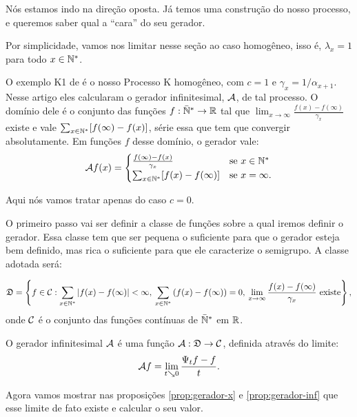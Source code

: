 Nós estamos indo na direção oposta. Já temos uma construção do nosso
processo, e queremos saber qual a ``cara'' do seu gerador.

Por simplicidade, vamos nos limitar nesse seção ao caso homogêneo,
isso é, $\lambda_x = 1$ para todo $x \in {\mathbb{N^*}}$.

O exemplo K1 de \cite{kendall:56} é o nosso Processo K homogêneo, com
$c = 1$ e $\gamma_x = 1/\alpha_{x+1}$. Nesse artigo eles calcularam o
gerador infinitesimal, ${\mathcal{A}}$, de tal processo. O domínio dele é o
conjunto das funções $f: {\mathbb{\bar{N}^*}} \to {\mathbb{R}}$ tal que $\lim_{x \to \infty} \frac{f(x)
  - f(\infty)}{\gamma_x}$ existe e vale $\sum_{x
  \in {\mathbb{N^*}}} [f(\infty) - f(x)]$, série essa que tem que convergir
absolutamente. Em funções $f$ desse domínio, o gerador vale:
\begin{align*}
  {\mathcal{A}} f (x) = \begin{cases}
    \frac{f(\infty) - f(x)}{\gamma_x} & \text{se } x \in {\mathbb{N^*}}\\
    \sum_{x\in {\mathbb{N^*}}} [f(x) - f(\infty)] & \text{se } x = \infty.
  \end{cases}
\end{align*}

Aqui nós vamos tratar apenas do caso $c = 0$.

O primeiro passo vai ser definir a classe de funções sobre a qual
iremos definir o gerador. Essa classe tem que ser pequena o suficiente
para que o gerador esteja bem definido, mas rica o suficiente para que
ele caracterize o semigrupo. A classe adotada será:

\begin{equation}
  \label{eq:classe-gerador}
  {\mathfrak{D}} = \left\{ f \in {\mathcal{C}}: \sum_{x\in {\mathbb{N^*}}} |f(x)-f(\infty)| < \infty,
    \:
    \sum_{x\in {\mathbb{N^*}}} \left( f(x)-f(\infty)\right) = 0, \:
    \lim_{x \to \infty} \frac{f(x) - f(\infty)}{\gamma_x} \textrm{ existe}
  \right\},
\end{equation}
onde ${\mathcal{C}}$ é o conjunto das funções contínuas de ${\mathbb{\bar{N}^*}}$ em ${\mathbb{R}}$.

\begin{definicao}
  \label{def:gerador}
  O gerador infinitesimal ${\mathcal{A}}$ é uma função ${\mathcal{A}}: {\mathfrak{D}} \to {\mathcal{C}}$,
  definida através do limite:
  \begin{equation}
    \label{eq:def-gerador}
    {\mathcal{A}} f = \lim_{t \searrow 0} \frac{\Psi_t f - f}{t}.
  \end{equation}
\end{definicao}

Agora vamos mostrar nas proposições \ref{prop:gerador-x} e
\ref{prop:gerador-inf} que esse limite de fato existe e calcular o seu
valor.

